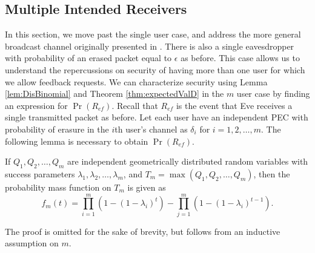 \documentclass[10pt,twocolumn,twoside]{IEEEtran} \newlength{\pic}
\theoremstyle{definition}
\theoremstyle{remark}
\theoremstyle{plain}
\begin{document}
\subsection{Multiple Intended Receivers}
In this section, we move past the single user case, and address the more general broadcast channel originally presented in \cite{Cover72}. There is also a single eavesdropper with probability of an erased packet equal to $\epsilon$ as before. This case allows us to understand the repercussions on security of having more than one user for which we allow feedback requests. We can characterize security using Lemma \ref{lem:DisBinomial} and Theorem \ref{thm:expectedValD} in the $m$ user case by finding an expression for $\Pr(R_{ef})$. Recall that $R_{ef}$ is the event that Eve receives a single transmitted packet as before. Let each user have an independent PEC with probability of erasure in the $i$th user's channel as $\delta_i$ for $i = 1,2,\ldots,m$. The following lemma is necessary to obtain $\Pr(R_{ef})$.
\begin{lemma}\label{lem:maxMusersGeomRVs}
 If $Q_1, Q_2, \ldots ,Q_m$ are independent geometrically distributed random variables with success parameters $\lambda_1,\lambda_2,\ldots,\lambda_m$, and $T_m = \max(Q_1,Q_2,\ldots,Q_m)$, then the probability mass function on $T_m$ is given as
 \begin{equation}
   f_m(t) = \prod_{i=1}^m(1-(1-\lambda_i)^t) - \prod_{j=1}^m(1-(1-\lambda_i)^{t-1}).
 \end{equation}
\end{lemma}
\begin{IEEEproof}
 The proof is omitted for the sake of brevity, but follows from an inductive assumption on $m$.
\end{IEEEproof}
\end{document}
